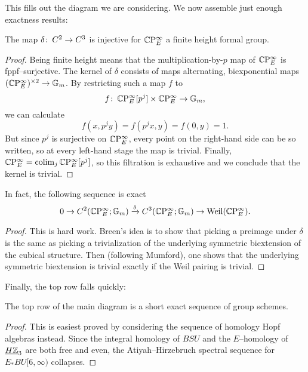 This fills out the diagram we are considering.  We now assemble just enough exactness results:

\begin{lemma}
The map $\delta\colon\thinspace C^2 \to C^3$ is injective for $\mathbb{C}\mathrm P^\infty_E$ a finite height formal group.
\end{lemma}
\begin{proof}
Being finite height means that the multiplication-by-$p$ map of $\mathbb{C}\mathrm P^\infty_E$ is fppf--surjective.  The kernel of $\delta$ consists of maps alternating, biexponential maps $(\mathbb{C}\mathrm P^\infty_E)^{\times 2} \to \mathbb G_m$.  By restricting such a map $f$ to \[f \colon\thinspace \mathbb{C}\mathrm P^\infty_E[p^j] \times \mathbb{C}\mathrm P^\infty_E \to \mathbb G_m,\] we can calculate \[f(x, p^j y) = f(p^j x, y) = f(0, y) = 1.\]  But since $p^j$ is surjective on $\mathbb{C}\mathrm P^\infty_E$, every point on the right-hand side can be so written, so at every left-hand stage the map is trivial.  Finally, $\mathbb{C}\mathrm P^\infty_E = \operatorname*{colim}_j \mathbb{C}\mathrm P^\infty_E[p^j]$, so this filtration is exhaustive and we conclude that the kernel is trivial.
\end{proof}

\begin{lemma}
In fact, the following sequence is exact \[0 \to C^2(\mathbb{C}\mathrm P^\infty_E; \mathbb G_m) \xrightarrow\delta C^3(\mathbb{C}\mathrm P^\infty_E; \mathbb G_m) \to \operatorname{Weil}(\mathbb{C}\mathrm P^\infty_E).\]
\end{lemma}
\begin{proof}
This is hard work.  Breen's idea is to show that picking a preimage under $\delta$ is the same as picking a trivialization of the underlying symmetric biextension of the cubical structure.  Then (following Mumford), one shows that the underlying symmetric biextension is trivial exactly if the Weil pairing is trivial.
\end{proof}

Finally, the top row falls quickly:

\begin{lemma}
The top row of the main diagram is a short exact sequence of group schemes.
\end{lemma}
\begin{proof}
This is easiest proved by considering the sequence of homology Hopf algebras instead.  Since the integral homology of $BSU$ and the $E$--homology of $\underline{\smash{H\mathbb Z}}_{3}$ are both free and even, the Atiyah--Hirzebruch spectral sequence for $E_* BU[6, \infty)$ collapses.
\end{proof}


